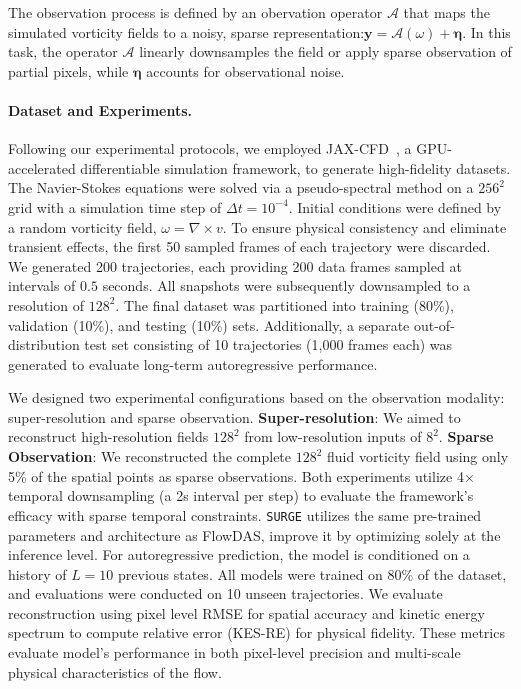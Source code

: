 \documentclass{article}
\theoremstyle{plain}
\theoremstyle{definition}
\theoremstyle{remark}
\begin{document}
The observation process is defined by an obervation operator $\mathcal{A}$ that maps the simulated vorticity fields to a noisy, sparse representation:$\boldsymbol{y} = \mathcal{A}(\omega) + \boldsymbol{\eta}.$ In this task, the operator $\mathcal{A}$ linearly downsamples the field or apply sparse observation of partial pixels, while $\boldsymbol{\eta}$ accounts for observational noise.

\paragraph{Dataset and Experiments.} 

Following our experimental protocols, we employed JAX-CFD~\cite{kochkov2021machine}, a GPU-accelerated differentiable simulation framework, to generate high-fidelity datasets. The Navier-Stokes equations were solved via a pseudo-spectral method on a $256^2$ grid with a simulation time step of $\Delta t = 10^{-4}$. Initial conditions were defined by a random vorticity field, $\omega = \nabla \times v$. To ensure physical consistency and eliminate transient effects, the first 50 sampled frames of each trajectory were discarded. We generated 200 trajectories, each providing 200 data frames sampled at intervals of $0.5$ seconds. All snapshots were subsequently downsampled to a resolution of $128^2$. The final dataset was partitioned into training (80\%), validation (10\%), and testing (10\%) sets. Additionally, a separate out-of-distribution test set consisting of 10 trajectories (1,000 frames each) was generated to evaluate long-term autoregressive performance.

We designed two experimental configurations based on the observation modality: super-resolution and sparse observation. \textbf{Super-resolution}: We aimed to reconstruct high-resolution fields $128^2$ from low-resolution inputs of $8^2$. \textbf{Sparse Observation}: We reconstructed the complete $128^2$ fluid vorticity field using only 5\% of the spatial points as sparse observations. Both experiments utilize 4$\times$ temporal downsampling (a 2s interval per step) to evaluate the framework's efficacy with sparse temporal constraints. \texttt{SURGE} utilizes the same pre-trained parameters and architecture as FlowDAS, improve it by optimizing solely at the inference level. For autoregressive prediction, the model is conditioned on a history of $L=10$ previous states. All models were trained on 80\% of the dataset, and evaluations were conducted on 10 unseen trajectories.
We evaluate reconstruction using pixel level RMSE for spatial accuracy and kinetic energy spectrum to compute relative error (KES-RE) for physical fidelity. These metrics evaluate model's performance in both pixel-level precision and multi-scale physical characteristics of the flow.
\end{document}
